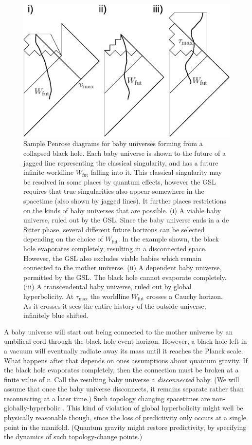 \documentclass[12pt]{article}
\begin{document}
\begin{figure}[ht]
\centering
\includegraphics[width=.8\textwidth]{babies.eps}
\caption{\small{
Sample Penrose diagrams for baby universes forming from a collapsed black hole.  Each baby universe is shown to the future of a jagged line representing the classical singularity, and has a future infinite worldline $W_\mathrm{fut}$ falling into it.  This classical singularity may be resolved in some places by quantum effects, however the GSL requires that true singularities also appear somewhere in the spacetime (also shown by jagged lines).  It further places restrictions on the kinds of baby universes that are possible.  (i) A viable baby universe, ruled out by the GSL.  Since the baby universe ends in a de Sitter phase, several different future horizons can be selected depending on the choice of $W_\mathrm{fut}$.  In the example shown, the black hole evaporates completely, resulting in a disconnected space.  However, the GSL also excludes viable babies which remain connected to the mother universe.  (ii) A dependent baby universe, permitted by the GSL.  The black hole cannot evaporate completely.  (iii) A transcendental baby universe, ruled out by global hyperbolicity.  At $\tau_\mathrm{max}$ the worldline $W_\mathrm{fut}$ crosses a Cauchy horizon.  As it crosses it sees the entire history of the outside universe, infinitely blue shifted.
}}\label{babies}
\end{figure}

\noindent A baby universe will start out being connected to the mother universe by an umbilical cord through the black hole event horizon.  However, a black hole left in a vacuum will eventually radiate away its mass until it reaches the Planck scale.  What happens after that depends on ones assumptions about quantum gravity.  If the black hole evaporates completely, then the connection must be broken at a finite value of $v$.  Call the resulting baby universe a \textit{disconnected} baby.  (We will assume that once the baby universe disconnects, it remains separate rather than reconnecting at a later time.)  Such topology changing spacetimes are non-globally-hyperbolic \cite{geroch}.  This kind of violation of global hyperbolicity might well be physically reasonable though, since the loss of predictivity only occurs at a single point in the manifold.  (Quantum gravity might restore predictivity, by specifying the dynamics of such topology-change points.)
\end{document}
